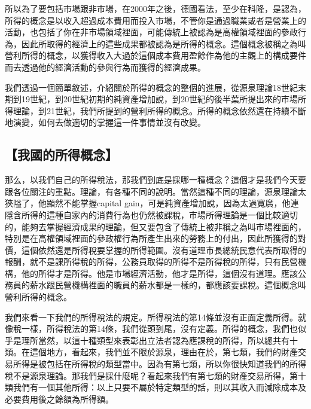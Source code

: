 \documentclass[oneside,sub3section]{ctexbook}
\begin{document}
所以為了要包括市場跟非市場，在2000年之後，德國看法，至少在科隆，是認為，所得的概念是以收入超過成本費用而投入市場，不管你是通過職業或者是營業上的活動，也包括了你在非市場領域裡面，可能傳統上被認為是高權領域裡面的參政行為，因此所取得的經濟上的這些成果都被認為是所得的概念。這個概念被稱之為叫營利所得的概念，以獲得收入大過於這個成本費用盈餘作為他的主觀上的構成要件而去透過他的經濟活動的參與行為而獲得的經濟成果。

我們透過一個簡單敘述，介紹關於所得的概念的整個的進展，從源泉理論18世紀末期到19世紀，到20世紀初期的純資產增加說，到20世紀的後半葉所提出來的市場所得理論，到21世紀，我們所提到的營利所得的概念。所得的概念依然還在持續不斷地演變，如何去做適切的掌握這一件事情並沒有改變。

\hypertarget{ux6211ux570bux7684ux6240ux5f97ux6982ux5ff5}{%
\subsection{【我國的所得概念】}\label{ux6211ux570bux7684ux6240ux5f97ux6982ux5ff5}}

那么，以我們自己的所得稅法，那我們到底是採哪一種概念？這個才是我們今天要跟各位關注的重點。理論，有各種不同的說明。當然這種不同的理論，源泉理論太狹隘了，他顯然不能掌握capital gain，可是純資產增加說，因為太過寬廣，他連隱含所得的這種自家內的消費行為也仍然被課稅，市場所得理論是一個比較適切的，能夠去掌握經濟成果的理論，但又要包含了傳統上被非稱之為叫市場裡面的，特別是在高權領域裡面的參政權行為所產生出來的勞務上的付出，因此所獲得的對價，這個依然還是所得稅要掌握的所得範圍。沒有道理市長總統民意代表所取得的報酬，就不是課所得稅的所得，公務員取得的所得不是所得稅的所得，只有民營機構，他的所得才是所得。他是市場經濟活動，他才是所得，這個沒有道理。應該公務員的薪水跟民營機構裡面的職員的薪水都是一樣的，都應該要課稅。這個概念叫營利所得的概念。

我們來看一下我們的所得稅法的規定。所得稅法的第14條並沒有正面定義所得。就像稅一樣，所得稅法的第14條，我們從頭到尾，沒有定義。所得的概念，我們也似乎是理所當然，以這十種類型來表彰出立法者認為應課稅的所得，所以總共有十類。在這個地方，看起來，我們並不限於源泉，理由在於，第七類，我們的財產交易所得是被包括在所得稅的類型當中。因為有第七類，所以你很快知道我們的所得稅不是源泉理論。那我們是採什麼呢？看起來我們有第七類的財產交易所得，第十類我們有一個其他所得：以上只要不屬於特定類型的話，則以其收入而減除成本及必要費用後之餘額為所得額。
\end{document}
